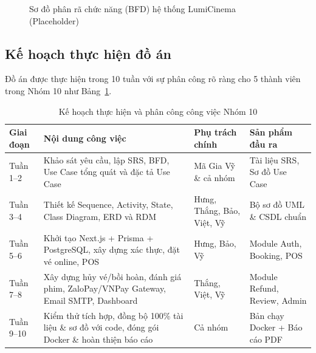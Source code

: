 \begin{figure}[H]
\centering
{}
\caption{Sơ đồ phân rã chức năng (BFD) hệ thống LumiCinema (Placeholder)}
\label{fig:bfd_placeholder}
\end{figure}

\subsection{Kế hoạch thực hiện đồ án}
Đồ án được thực hiện trong 10 tuần với sự phân công rõ ràng cho 5 thành viên trong Nhóm 10 như Bảng~\ref{tab:plan}.

\begin{table}[H]
\centering
\caption{Kế hoạch thực hiện và phân công công việc Nhóm 10}
\label{tab:plan}
\renewcommand{\arraystretch}{1.25}
\begin{tabular}{|p{1.8cm}|p{5.5cm}|p{4.3cm}|p{3.5cm}|}
\hline
\rowcolor{headerblue} \textbf{Giai đoạn} & \textbf{Nội dung công việc} & \textbf{Phụ trách chính} & \textbf{Sản phẩm đầu ra} \\ \hline
Tuần 1--2 & Khảo sát yêu cầu, lập SRS, BFD, Use Case tổng quát và đặc tả Use Case & Mã Gia Vỹ \& cả nhóm & Tài liệu SRS, Sơ đồ Use Case \\ \hline
Tuần 3--4 & Thiết kế Sequence, Activity, State, Class Diagram, ERD và RDM & Hưng, Thắng, Bảo, Việt, Vỹ & Bộ sơ đồ UML \& CSDL chuẩn \\ \hline
Tuần 5--6 & Khởi tạo Next.js + Prisma + PostgreSQL, xây dựng xác thực, đặt vé online, POS & Hưng, Bảo, Vỹ & Module Auth, Booking, POS \\ \hline
Tuần 7--8 & Xây dựng hủy vé/bồi hoàn, đánh giá phim, ZaloPay/VNPay Gateway, Email SMTP, Dashboard & Thắng, Việt, Vỹ & Module Refund, Review, Admin \\ \hline
Tuần 9--10 & Kiểm thử tích hợp, đồng bộ 100\% tài liệu \& sơ đồ với code, đóng gói Docker \& hoàn thiện báo cáo & Cả nhóm & Bản chạy Docker + Báo cáo PDF \\ \hline
\end{tabular}
\end{table}
